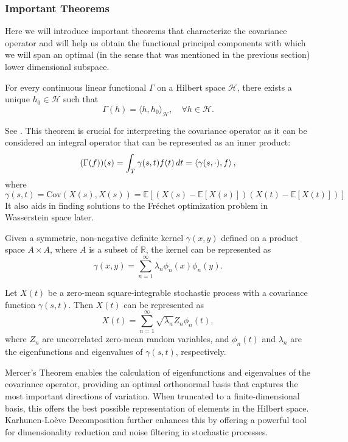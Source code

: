 \subsubsection{Important Theorems}
\label{sec:theorems}
Here we will introduce important theorems that characterize the covariance operator
and will help us obtain the functional principal components with which we will span
an optimal (in the sense that was mentioned in the previous section) lower dimensional subspace.
\begin{theorem}
    \label{th:riesz}
    For every continuous linear functional \(\Gamma\) on a Hilbert space \(\mathcal{H}\), there
    exists a unique \(h_0 \in \mathcal{H}\) such that
    \[
        \Gamma(h) = \langle h, h_0 \rangle_{\mathcal{H}}, \quad \forall h \in \mathcal{H}.
    \]
\end{theorem}
See \Textcite[Chapter~1, \S 3]{Conway2007}. This theorem is crucial for interpreting the
covariance operator as it can be considered an integral operator that can be represented
as an inner product:
\begin{equation}
    (\Gamma(f))(s) = \int_{T} \gamma(s, t) f(t) \, dt = \left \langle \gamma(s, \cdot), f \right \rangle,
\end{equation}
where $\gamma(s, t) = \text{Cov}(X(s), X(s)) = \mathbb{E}[(X(s) - \mathbb{E}[X(s)])(X(t) - \mathbb{E}[X(t)])]$
It also aids in finding solutions to the Fréchet optimization problem in Wasserstein space
later.

\begin{theorem}
Given a symmetric, non-negative definite kernel \(\gamma(x, y)\) defined on a product space
\(A \times A\), where \(A\) is a subset of \(\mathbb{R}\), the kernel can be represented
as
\[
    \gamma(x, y) = \sum_{n=1}^{\infty} \lambda_n \phi_n(x) \phi_n(y).
\]
\end{theorem}
\begin{theorem}
Let \(X(t)\) be a zero-mean square-integrable stochastic process with a covariance
function \(\gamma(s, t)\). Then \(X(t)\) can be represented as
\[
    X(t) = \sum_{n=1}^{\infty} \sqrt{\lambda_n} Z_n \phi_n(t),
\]
where \(Z_n\) are uncorrelated zero-mean random variables, and \(\phi_n(t)\) and
\(\lambda_n\) are the eigenfunctions and eigenvalues of \(\gamma(s, t)\), respectively.
\end{theorem}
Mercer's Theorem enables the calculation of eigenfunctions and eigenvalues of the
covariance operator, providing an optimal orthonormal basis that captures the most
important directions of variation. When truncated to a finite-dimensional basis, this
offers the best possible representation of elements in the Hilbert space. Karhunen-Loève
Decomposition further enhances this by offering a powerful tool for dimensionality
reduction and noise filtering in stochastic processes.

